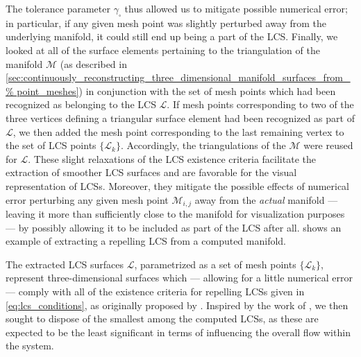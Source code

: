 The tolerance parameter $\gamma_{\square}$ thus allowed us to mitigate possible
numerical error; in particular, if any given mesh point was slightly perturbed
away from the underlying manifold, it could still end up being a part of the
LCS. Finally, we looked at all of the surface elements pertaining to the
triangulation of the manifold $\mathcal{M}$ (as described in
\cref{sec:continuously_reconstructing_three_dimensional_manifold_surfaces_from_%
point_meshes}) in conjunction with the set of mesh points which had been
recognized as belonging to the LCS $\mathcal{L}$. If mesh points corresponding
to two of the three vertices defining a triangular surface element had been
recognized as part of $\mathcal{L}$, we then added the mesh point corresponding
to the last remaining vertex to the set of LCS points $\{\mathcal{L}_{k}\}$.
Accordingly, the triangulations of the $\mathcal{M}$ were reused for
$\mathcal{L}$. These slight relaxations of the LCS existence criteria
facilitate the extraction of smoother LCS surfaces and are favorable for the
visual representation of LCSs. Moreover, they mitigate the possible effects of
numerical error perturbing any given mesh point $\mathcal{M}_{i,j}$ away from
the \emph{actual} manifold --- leaving it more than sufficiently close to the
manifold for visualization purposes --- by possibly allowing it to be included
as part of the LCS after all.  shows an
example of extracting a repelling LCS from a computed manifold.



The extracted LCS surfaces $\mathcal{L}$, parametrized as a set of mesh points
$\{\mathcal{L}_{k}\}$, represent three-dimensional surfaces which --- allowing
for a little numerical error --- comply with all of the existence criteria
for repelling LCSs given in \cref{eq:lcs_conditions}, as originally proposed by
\textcite{haller2011variational}. Inspired by the work of
\textcite{farazmand2012computing}, we then sought to dispose of the smallest
among the computed LCSs, as these are expected to be the least significant in
terms of influencing the overall flow within the system.

